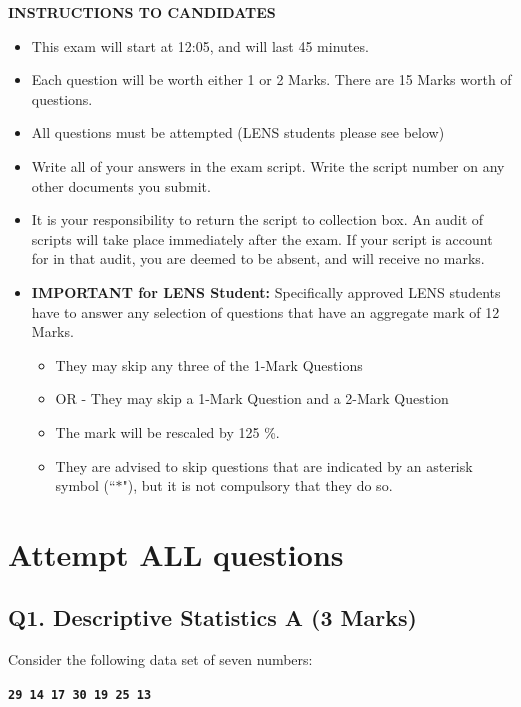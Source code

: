 \documentclass[a4paper,12pt]{article}
\begin{document}
\begin{center}
	{\bf INSTRUCTIONS TO CANDIDATES}
\end{center}
\begin{itemize} 
	\item This exam will start at 12:05, and will last 45 minutes.
	
	\item Each question will be worth either 1 or 2 Marks. There are 15 Marks worth of questions.
	\item All questions must be attempted (LENS students please see below)
	
	\item Write all of your answers in the exam script. Write the script number on any other documents you submit.
	
	\item It is your responsibility to return the script to collection box. An audit of scripts will take place immediately after the exam. If your script is account for in that audit,  you are deemed to be absent, and will receive no marks.
	
	\item \textbf{IMPORTANT for LENS Student:}
	Specifically approved LENS students have to answer any selection of questions that have an aggregate mark of 12 Marks.  
	\begin{itemize}
		\item They may skip any three of the 1-Mark Questions
		\item OR - They may skip a 1-Mark Question and a 2-Mark Question
		\item The mark will be rescaled by 125 \%.
		\item They are advised to skip questions that are indicated by an asterisk symbol (``$\ast$"), but it is not compulsory that they do so.
	\end{itemize}
	
	
\end{itemize}
\newpage
\section*{Attempt ALL questions}

\subsection*{Q1. Descriptive Statistics A (3 Marks)} %
Consider the following data set of seven numbers:

\begin{center}
	\textbf{\texttt{29 14 17 30 19 25 13}}
\end{center}
\end{document}
